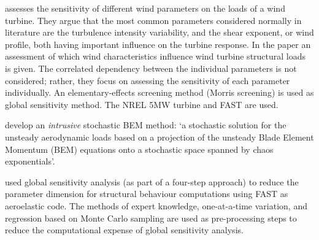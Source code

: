 \documentclass[review]{elsarticle}
\numberwithin{equation}{section}
\numberwithin{equation}{section}
\begin{document}
\cite{Robertson2018} assesses the sensitivity of different wind parameters on the loads of a wind turbine. They argue that the most common parameters considered normally in literature are the turbulence intensity variability, and the shear exponent, or wind profile, both having important influence on the turbine response. In the paper an assessment of which wind characteristics influence wind turbine structural loads is given. The correlated dependency between the individual parameters is not considered; rather, they focus on assessing the sensitivity of each parameter individually. An elementary-effects screening method (Morris screening) is used as global sensitivity method. The NREL 5MW turbine and FAST are used.

\cite{Fluck2018} develop an \textit{intrusive} stochastic BEM method: `a stochastic solution for the unsteady aerodynamic loads based on a projection of the unsteady Blade Element Momentum (BEM) equations onto a stochastic space spanned by chaos exponentials'.

\cite{Hubler2017} used global sensitivity analysis (as part of a four-step approach) to reduce the parameter dimension for structural behaviour computations using FAST as aeroelastic code. The methods of expert knowledge, one-at-a-time variation, and regression based on Monte Carlo sampling are used as pre-processing steps to reduce the computational expense of global sensitivity analysis.
\end{document}
